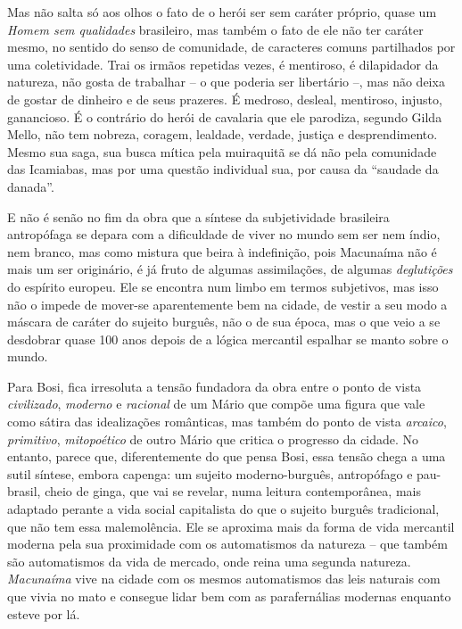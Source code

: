 Mas não salta só aos olhos o fato de o herói ser sem caráter próprio,
quase um \emph{Homem sem qualidades} brasileiro, mas também o fato de
ele não ter caráter mesmo, no sentido do senso de comunidade, de
caracteres comuns partilhados por uma coletividade. Trai os irmãos
repetidas vezes, é mentiroso, é dilapidador da natureza, não gosta de
trabalhar -- o que poderia ser libertário --, mas não deixa de gostar de
dinheiro e de seus prazeres. É medroso, desleal, mentiroso, injusto,
ganancioso. É o contrário do herói de cavalaria que ele parodiza,
segundo Gilda Mello, não tem nobreza, coragem, lealdade, verdade,
justiça e desprendimento. Mesmo sua saga, sua busca mítica pela
muiraquitã se dá não pela comunidade das Icamiabas, mas por uma questão
individual sua, por causa da ``saudade da danada''.

E não é senão no fim da obra que a síntese da subjetividade brasileira
antropófaga se depara com a dificuldade de viver no mundo sem ser nem
índio, nem branco, mas como mistura que beira à indefinição, pois
Macunaíma não é mais um ser originário, é já fruto de algumas
assimilações, de algumas \emph{deglutições} do espírito europeu. Ele se
encontra num limbo em termos subjetivos, mas isso não o impede de
mover-se aparentemente bem na cidade, de vestir a seu modo a máscara de
caráter do sujeito burguês, não o de sua época, mas o que veio a se
desdobrar quase 100 anos depois de a lógica mercantil espalhar se manto
sobre o mundo.

Para Bosi, fica irresoluta a tensão fundadora da obra entre o ponto de
vista \emph{civilizado}, \emph{moderno} e \emph{racional} de um Mário
que compõe uma figura que vale como sátira das idealizações românticas,
mas também do ponto de vista \emph{arcaico}, \emph{primitivo},
\emph{mitopoético} de outro Mário que critica o progresso da cidade. No
entanto, parece que, diferentemente do que pensa Bosi, essa tensão chega
a uma sutil síntese, embora capenga: um sujeito moderno-burguês,
antropófago e pau-brasil, cheio de ginga, que vai se revelar, numa
leitura contemporânea, mais adaptado perante a vida social capitalista
do que o sujeito burguês tradicional, que não tem essa malemolência. Ele
se aproxima mais da forma de vida mercantil moderna pela sua proximidade
com os automatismos da natureza -- que também são automatismos da vida
de mercado, onde reina uma segunda natureza. \emph{Macunaíma} vive na
cidade com os mesmos automatismos das leis naturais com que vivia no
mato e consegue lidar bem com as parafernálias modernas enquanto esteve
por lá.

